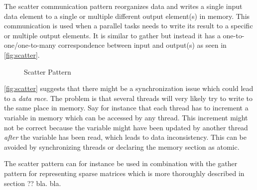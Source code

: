 The scatter communication pattern reorganizes data and writes a single input data element to a single or multiple different output element(s) in memory.
This communication is used when a parallel tasks needs to write its result to a specific or multiple output elements.
It is similar to gather but instead it has a one-to-one/one-to-many correspondence between input and output(s) as seen in \autoref{fig:scatter}.
\begin{figure}[ht]
	\centering
	\caption{Scatter Pattern}
	\label{fig:scatter}
\end{figure}
\autoref{fig:scatter} suggests that there might be a synchronization issue which could lead to a \textit{data race}.
The problem is that several threads will very likely try to write to the same place in memory.
Say for instance that each thread has to increment a variable in memory which can be accessed by any thread.
This increment might not be correct because the variable might have been updated by another thread \textit{after} the variable has been read, which leads to data inconsistency.
This can be avoided by synchronizing threads or declaring the memory section as atomic.

The scatter pattern can for instance be used in combination with the gather pattern for representing sparse matrices which is more thoroughly described in section ?? bla. bla.